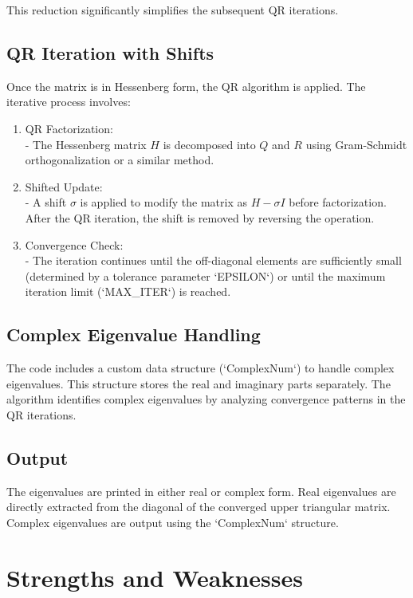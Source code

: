 \documentclass{article}
\begin{document}
This reduction significantly simplifies the subsequent QR iterations.

\subsection{ QR Iteration with Shifts}
Once the matrix is in Hessenberg form, the QR algorithm is applied. The iterative process involves:
\begin{enumerate}

\item  QR Factorization:\\
   - The Hessenberg matrix \( H \) is decomposed into \( Q \) and \( R \) using Gram-Schmidt orthogonalization or a similar method.
\item Shifted Update:\\
   - A shift \( \sigma \) is applied to modify the matrix as \( H - \sigma I \) before factorization. After the QR iteration, the shift is removed by reversing the operation.
\item Convergence Check:\\
   - The iteration continues until the off-diagonal elements are sufficiently small (determined by a tolerance parameter `EPSILON`) or until the maximum iteration limit (`MAX\_ITER`) is reached.
\end{enumerate}
\subsection{ Complex Eigenvalue Handling}
The code includes a custom data structure (`ComplexNum`) to handle complex eigenvalues. This structure stores the real and imaginary parts separately. The algorithm identifies complex eigenvalues by analyzing convergence patterns in the QR iterations.

\subsection{ Output}
The eigenvalues are printed in either real or complex form. Real eigenvalues are directly extracted from the diagonal of the converged upper triangular matrix. Complex eigenvalues are output using the `ComplexNum` structure.

\section{ Strengths and Weaknesses}
\end{document}
